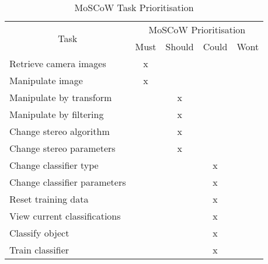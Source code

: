 \begin{table}
\centering
\begin{tabular}{|l|c|c|c|c|}
\hline
\multicolumn{1}{|c|}{\multirow{2}{*}{Task}} & \multicolumn{4}{c|}{MoSCoW Prioritisation} \\ \cline{2-5} 
\multicolumn{1}{|c|}{}                      & Must     & Should     & Could    & Wont    \\ \hline
Retrieve camera images                      & x        &            &          &         \\ \cline{1-1}
Manipulate image                            & x        &            &          &         \\ \cline{1-1}
Manipulate by transform                     &          & x          &          &         \\ \cline{1-1}
Manipulate by filtering                     &          & x          &          &         \\ \cline{1-1}
Change stereo algorithm                     &          & x          &          &         \\ \cline{1-1}
Change stereo parameters                    &          & x          &          &         \\ \cline{1-1}
Change classifier type                      &          &            & x        &         \\ \cline{1-1}
Change classifier parameters                &          &            & x        &         \\ \cline{1-1}
Reset training data                         &          &            & x        &         \\ \cline{1-1}
View current classifications                &          &            & x        &         \\ \cline{1-1}
Classify object                             &          &            & x        &         \\ \cline{1-1}
Train classifier                            &          &            & x        &         \\ \hline
\end{tabular}
\caption{MoSCoW Task Prioritisation\protect {\label{tab:moscow_table}}}
\end{table}

